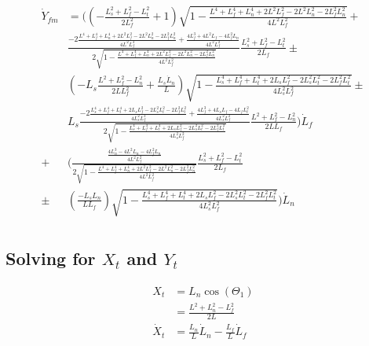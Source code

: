 \documentclass[11pt, landscape]{article}
\begin{document}
\begin{align}
    \dot{Y}_{fm} &=
    \Bigg(\left(-\frac{L_{s}^2+L_f^2-L_{t}^2}{2L_f^2} + 1\right)\sqrt{1-\frac{L^4 + L_f^4 + L_n^4 + 2L^2L_f^2 - 2L^2L_n^2 - 2L_f^2L_n^2}{4L^2L_f^2}} +\\
    &\frac{-2\frac{L^4 + L_f^4 + L_n^4 + 2L^2L_f^2 - 2L^2L_n^2 - 2L_f^2L_n^2}{4L^2L_f^3} + \frac{4L_f^3 + 4L^2L_f - 4L_f^2L_n}{4L^2L_f^2}}{2\sqrt{1-\frac{L^4 + L_f^4 + L_n^4 + 2L^2L_f^2 - 2L^2L_n^2 - 2L_f^2L_n^2}{4L^2L_f^2}}}\frac{L_{s}^2+L_f^2-L_{t}^2}{2L_f} \pm\\
    &\left(-L_s\frac{L^2+L_f^2-L_n^2}{2LL_f^2} + \frac{L_s\dot{L}_n}{L}\right)\sqrt{1-\frac{L_s^4 + L_f^4 + L_t^4 + 2L_sL_f^2 - 2L_s^2L_t^2 - 2L_f^2L_t^2}{4L_s^2L_f^2}} \pm\\
    &L_s\frac{-2\frac{L_s^4 + L_f^4 + L_t^4 + 2L_sL_f^2 - 2L_s^2L_t^2 - 2L_f^2L_t^2}{4L_s^2L_f^3} + \frac{4L_f^3 + 4L_sL_f - 4L_fL_t^2}{4L_s^2L_f^2}}{2\sqrt{1-\frac{L_s^4 + L_f^4 + L_t^4 + 2L_sL_f^2 - 2L_s^2L_t^2 - 2L_f^2L_t^2}{4L_s^2L_f^2}}}\frac{L^2+L_f^2-L_n^2}{2LL_f}\Bigg)\dot{L}_f\\
    + &\Bigg(\frac{\frac{4L_n^3 - 4L^2L_n - 4L_f^2L_n}{4L^2L_f^2}}{2\sqrt{1-\frac{L^4 + L_f^4 + L_n^4 + 2L^2L_f^2 - 2L^2L_n^2 - 2L_f^2L_n^2}{4L^2L_f^2}}}\frac{L_{s}^2+L_f^2-L_{t}^2}{2L_f}\\
    \pm &\left(\frac{-L_sL_n}{LL_f}\right)\sqrt{1-\frac{L_s^4 + L_f^4 + L_t^4 + 2L_sL_f^2 - 2L_s^2L_t^2 - 2L_f^2L_t^2}{4L_s^2L_f^2}}\Bigg)\dot{L}_n\\
\end{align}

\subsection{Solving for $X_t$ and $Y_t$}

\begin{align}
  X_{t} &= L_n\cos(\Theta_{1}) \\
  &= \frac{L^2+L_n^2-L_f^2}{2L} \\
  \dot{X}_t &= \frac{L_n}{L}\dot{L}_n - \frac{L_f}{L}\dot{L}_f\\
\end{align}
\end{document}
